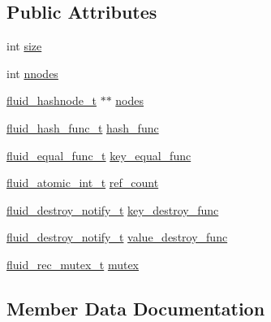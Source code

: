 \subsection*{Public Attributes}
\begin{DoxyCompactItemize}
\item 
int \hyperlink{struct__fluid__hashtable__t_a29098c1a78cf9f3da0533e1df6ccecb9}{size}
\item 
int \hyperlink{struct__fluid__hashtable__t_a3389f9edcde2da407d2b33b9188fb730}{nnodes}
\item 
\hyperlink{fluid__hash_8h_a050a9781c9fa10e4b1caac67d32b9be4}{fluid\+\_\+hashnode\+\_\+t} $\ast$$\ast$ \hyperlink{struct__fluid__hashtable__t_af081a4263642d0400911b66acdf5de6a}{nodes}
\item 
\hyperlink{fluid__hash_8h_a0e826a2bc5ac0e62333df8bfa69880b0}{fluid\+\_\+hash\+\_\+func\+\_\+t} \hyperlink{struct__fluid__hashtable__t_a0ab4f6b3c18566cc16f5154447cdf126}{hash\+\_\+func}
\item 
\hyperlink{fluid__hash_8h_a327b756916612446e0de653cadaff492}{fluid\+\_\+equal\+\_\+func\+\_\+t} \hyperlink{struct__fluid__hashtable__t_a88c8b5a92bb5cdb478fa4d4bb9d5d448}{key\+\_\+equal\+\_\+func}
\item 
\hyperlink{fluidsynth__priv_8h_a6b8be882dd9958ea3635a868e1bf5152}{fluid\+\_\+atomic\+\_\+int\+\_\+t} \hyperlink{struct__fluid__hashtable__t_a48e1a2ba92a03664a9bcaabc585d3554}{ref\+\_\+count}
\item 
\hyperlink{fluid__hash_8h_a5fe009909539e295b7af5978fed06126}{fluid\+\_\+destroy\+\_\+notify\+\_\+t} \hyperlink{struct__fluid__hashtable__t_a278a70733615c92d30129ac636d2dab6}{key\+\_\+destroy\+\_\+func}
\item 
\hyperlink{fluid__hash_8h_a5fe009909539e295b7af5978fed06126}{fluid\+\_\+destroy\+\_\+notify\+\_\+t} \hyperlink{struct__fluid__hashtable__t_a96b147edad0233ebd40884f46297ea87}{value\+\_\+destroy\+\_\+func}
\item 
\hyperlink{fluid__sys_8h_a8e5bc2095bf6a26aa487db766bfb6660}{fluid\+\_\+rec\+\_\+mutex\+\_\+t} \hyperlink{struct__fluid__hashtable__t_a71f461017357e83c71b2e8947222372f}{mutex}
\end{DoxyCompactItemize}


\subsection{Member Data Documentation}
\mbox{\label{struct__fluid__hashtable__t_a0ab4f6b3c18566cc16f5154447cdf126}} 
